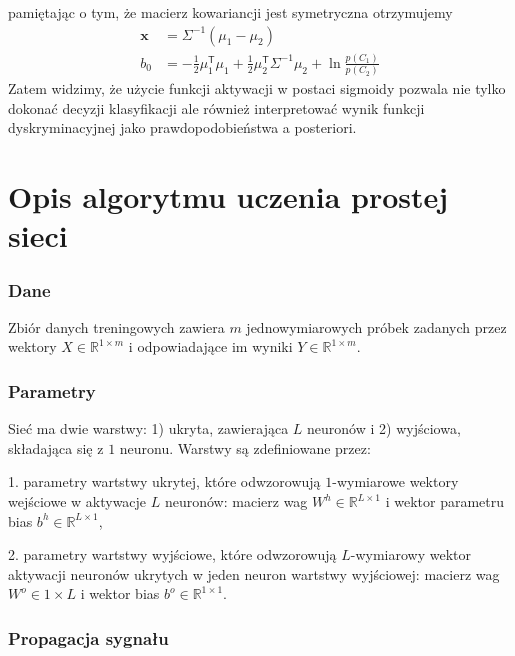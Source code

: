 \documentclass[11pt]{book}
\theoremstyle{definition}
\begin{document}
%
pamiętając o tym, że macierz kowariancji jest symetryczna otrzymujemy
%
\begin{subequations}
	\begin{align}
	\mathbf{x} &= \Sigma^{-1} \left(\mu_1 - \mu_2\right)\\
	b_0 &= - \frac{1}{2} \mu_1^\mathsf{T}\mu_1 + \frac{1}{2} \mu_2^\mathsf{T} \Sigma^{-1} \mu_2 + \ln \frac{p(C_1)}{p(C_2)}
	\end{align}
\end{subequations}
%
Zatem widzimy, że użycie funkcji aktywacji w postaci sigmoidy pozwala nie tylko dokonać decyzji klasyfikacji ale również interpretować wynik funkcji dyskryminacyjnej jako prawdopodobieństwa a posteriori.
%


\section{Opis algorytmu uczenia prostej sieci}

\subsubsection{Dane}

Zbiór danych treningowych zawiera $m$ jednowymiarowych próbek zadanych przez wektory $X \in \mathbb{R}^{1\times m}$ i odpowiadające im wyniki $Y\in \mathbb{R}^{1\times m}$.



\subsubsection{Parametry}

Sieć ma dwie warstwy: 1) ukryta, zawierająca $L$ neuronów i 2) wyjściowa, składająca się z $1$ neuronu. Warstwy są zdefiniowane przez:

1. parametry wartstwy ukrytej, które odwzorowują $1$-wymiarowe wektory wejściowe w aktywacje $L$ neuronów:
macierz wag $W^h\in\mathbb{R}^{L\times 1	}$ i wektor parametru bias $b^h\in\mathbb{R}^{L\times 1}$,

2. parametry wartstwy wyjściowe, które odwzorowują $L$-wymiarowy wektor aktywacji neuronów ukrytych w jeden neuron wartstwy wyjściowej:
macierz wag $W^o\in{1\times L}$ i wektor bias $b^o\in\mathbb{R}^{1\times 1}$.


\subsubsection{Propagacja sygnału}
\end{document}
